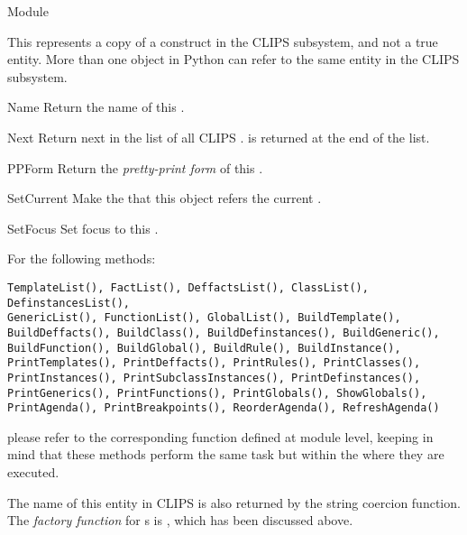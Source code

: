 \begin{classdesc*}{Module}

This represents a copy of a  construct in the CLIPS
subsystem, and not a true  entity. More than one
 object in Python can refer to the same 
entity in the CLIPS subsystem.

\begin{memberdesc}[property]{Name}
Return the name of this .
\end{memberdesc}

\begin{methoddesc}{Next}{}
Return next  in the list of all CLIPS .
 is returned at the end of the list.
\end{methoddesc}

\begin{methoddesc}{PPForm}{}
Return the \emph{pretty-print form} of this .
\end{methoddesc}

\begin{methoddesc}{SetCurrent}{}
Make the  that this object refers the current .
\end{methoddesc}

\begin{methoddesc}{SetFocus}{}
Set focus to this .
\end{methoddesc}

For the following methods:
\begin{verbatim}
TemplateList(), FactList(), DeffactsList(), ClassList(), DefinstancesList(),
GenericList(), FunctionList(), GlobalList(), BuildTemplate(),
BuildDeffacts(), BuildClass(), BuildDefinstances(), BuildGeneric(),
BuildFunction(), BuildGlobal(), BuildRule(), BuildInstance(),
PrintTemplates(), PrintDeffacts(), PrintRules(), PrintClasses(),
PrintInstances(), PrintSubclassInstances(), PrintDefinstances(),
PrintGenerics(), PrintFunctions(), PrintGlobals(), ShowGlobals(),
PrintAgenda(), PrintBreakpoints(), ReorderAgenda(), RefreshAgenda()
\end{verbatim}

please refer to the corresponding function defined at module level,
keeping in mind that these methods perform the same task but within the
 where they are executed.

The name of this entity in CLIPS is also returned by the string coercion
function. The \emph{factory function} for s is
, which has been discussed above.

\end{classdesc*}



